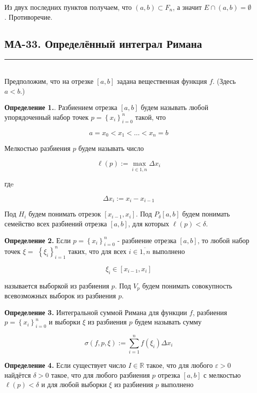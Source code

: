 \documentclass[a4paper,12pt]{article} %
\newcommand{\HRule}{\rule{\linewidth}{0.5mm}}
\begin{document}
Из двух последних пунктов получаем, что $(a, b) \subset F_{n}$, а значит $E \cap(a, b)=\emptyset$. Противоречие.


	\newpage

	\begin{LARGE}
		\begin{center}
			\section{МА-33. Определённый интеграл Римана}
		\end{center}
	\end{LARGE}
	\HRule \\

	Предположим, что на отрезке $[a, b]$ задана вещественная функция $f$. (Здесь $a<b$.)
	
	\textbf{Определение 1.}. Разбиением отрезка $[a, b]$ будем называть любой упорядоченный набор точек $p=\left\{x_{i}\right\}_{i=0}^{n}$ такой, что
	
	$$
	a=x_{0}<x_{1}<\ldots<x_{n}=b
	$$
	
	Мелкостью разбиения $p$ будем называть число
	
	$$
	\ell(p):=\max _{i \in \overline{1, n}} \Delta x_{i}
	$$
	
	гдe
	
	$$
	\Delta x_{i}:=x_{i}-x_{i-1}
	$$
	
	Под $H_{i}$ будем понимать отрезок $\left[x_{i-1}, x_{i}\right]$. Под $P_{\delta}[a, b]$ будем понимать семейство всех разбиений отрезка $[a, b]$, для которых $\ell(p)<\delta$.
	
	\textbf{Определение 2.} Если $p=\left\{x_{i}\right\}_{i=0}^{n}$ - разбиение отрезка $[a, b]$, то любой набор точек $\xi=$ $\left\{\xi_{i}\right\}_{i=1}^{n}$ таких, что для всех $i \in \overline{1, n}$ выполнено
	
	$$
	\xi_{i} \in\left[x_{i-1}, x_{i}\right]
	$$
	
	называется выборкой из разбиения $p$. Под $V_{p}$ будем понимать совокупность всевозможных выборок из разбиения $p$.
	
	\textbf{Определение 3.} Интегральной суммой Римана для функции $f$, разбиения $p=\left\{x_{i}\right\}_{i=0}^{n}$ и выборки $\xi$ из разбиения $p$ будем называть сумму
	
	$$
	\sigma(f, p, \xi):=\sum_{i=1}^{n} f\left(\xi_{i}\right) \Delta x_{i}
	$$
	
	\textbf{Определение 4.} Если существует число $I \in \mathbb{R}$ такое, что для любого $\varepsilon>0$ найдётся $\delta>0$ такое, что для любого разбиения $p$ отрезка $[a, b]$ с мелкостью $\ell(p)<\delta$ и для любой выборки $\xi$ из разбиения $p$ выполнено
	
\end{document}
